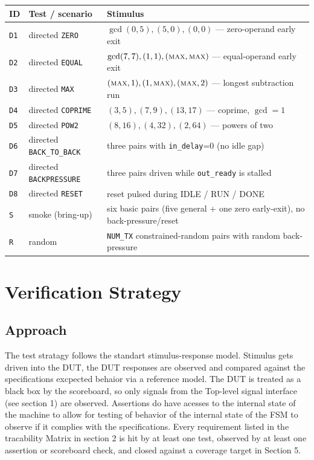 \documentclass[11pt,a4paper]{article}
\begin{document}
{{\small
\begin{longtable}{@{}p{0.9cm} p{3.6cm} p{8.5cm}@{}}
\toprule
\textbf{ID} & \textbf{Test / scenario} & \textbf{Stimulus} \\
\midrule
\endhead
\texttt{D1} & directed \texttt{ZERO}         & $\gcd(0,5),(5,0),(0,0)$ --- zero-operand early exit \\
\texttt{D2} & directed \texttt{EQUAL}        & $\gcd(7,7),(1,1),(\textsc{max},\textsc{max})$ --- equal-operand early exit \\
\texttt{D3} & directed \texttt{MAX}          & $(\textsc{max},1),(1,\textsc{max}),(\textsc{max},2)$ --- longest subtraction run \\
\texttt{D4} & directed \texttt{COPRIME}      & $(3,5),(7,9),(13,17)$ --- coprime, $\gcd=1$ \\
\texttt{D5} & directed \texttt{POW2}         & $(8,16),(4,32),(2,64)$ --- powers of two \\
\texttt{D6} & directed \texttt{BACK\_TO\_BACK} & three pairs with \texttt{in\_delay}=0 (no idle gap) \\
\texttt{D7} & directed \texttt{BACKPRESSURE}   & three pairs driven while \texttt{out\_ready} is stalled \\
\texttt{D8} & directed \texttt{RESET}          & reset pulsed during IDLE / RUN / DONE \\
\texttt{S}  & smoke (bring-up)               & six basic pairs (five general + one zero early-exit), no back-pressure/reset \\
\texttt{R}  & random                         & \texttt{NUM\_TX} constrained-random pairs with random back-pressure \\
\bottomrule
\end{longtable}
}

\section{Verification Strategy}

\subsection{Approach}

The test stratagy follows the standart stimulus-response model. Stimulus gets driven into the DUT, the DUT responses are observed and compared against the specifications excpected behaior via a reference model. The DUT is treated as a black box by the scoreboard, so only signals from the Top-level signal interface (see section 1) are observed. Assertions do have acesses to the internal state of the machine to allow for testing of behavior of the  internal state of the FSM to observe if it complies with the  specifications.
\newline
Every requirement listed in the tracability Matrix in section 2 is hit by at least one test, observed by at least one assertion or scoreboard check, and closed against a coverage target in Section 5.

}
\end{document}
